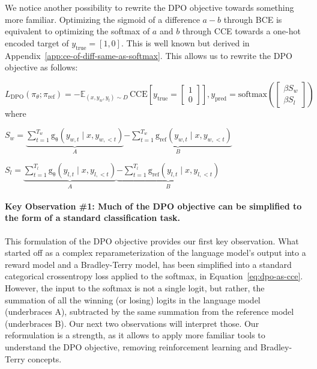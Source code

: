 \documentclass[twoside,11pt]{article}
\begin{document}
We notice another possibility to rewrite the DPO objective towards something
more familiar. Optimizing the sigmoid of a difference $a-b$ through BCE 
is equivalent to optimizing the softmax of $a$ and $b$ through CCE towards 
a one-hot encoded target of $y_\mathrm{true} = [1, 0]$. 
This is well known
but derived in Appendix~\ref{app:ce-of-diff-same-as-softmax}. This allows
us to rewrite the DPO objective as follows:

\begin{equation}
\label{eq:dpo-as-cce}
L_\mathrm{DPO}(\pi_\theta; \pi_\mathrm{ref}) = 
-\mathbb{E}_{(x, y_w, y_l) \sim D} \, 
\text{CCE}
\left[
y_\mathrm{true} = 
\begin{bmatrix}
1 \\ 
0
\end{bmatrix}
\right]
,
y_\mathrm{pred} = \text{softmax}
\left(
\begin{bmatrix}
\beta S_w \\ 
\beta S_l
\end{bmatrix}
\right)
\end{equation}
where
\begin{description}
\item
$ S_w = 
  \underbrace{
    \sum_{t=1}^{T_w} \mathrm{g_\theta}(y_{w,t} \mid x, y_{w,<t}) 
    }_{A}
    \underbrace{
  - 
  \sum_{t=1}^{T_w}\mathrm{g_\mathrm{ref}}(y_{w,t} \mid x, y_{w,<t})
  }_{B}
$
\item
$
S_l = 
  \underbrace{
    \sum_{t=1}^{T_l} \mathrm{g_\theta}(y_{l,t} \mid x, y_{l,<t}) 
  }_{A}
  \underbrace{
  - 
  \sum_{t=1}^{T_l} \mathrm{g_\mathrm{ref}}(y_{l,t} \mid x, y_{l,<t})
  }_{B}
$
\end{description}

\paragraph{Key Observation \#1: Much of the DPO objective 
can be simplified to the form of a 
standard classification task.} \label{obs:dpo-as-cce}
This formulation of the DPO objective provides our first key observation. 
What started off as a complex reparameterization 
of the language model's output into a reward
model and a Bradley-Terry model, 
has been simplified into a standard 
categorical crossentropy loss applied to the softmax, in
Equation~\ref{eq:dpo-as-cce}. However, the
input to the softmax is not a single logit, but rather, the 
summation of all the winning (or losing) logits in the language model
(underbraces A), 
subtracted by the same summation from the reference model (underbraces B).
Our next two observations will interpret those. Our reformulation
is a strength, as it allows to apply more familiar tools to understand
the DPO objective, removing reinforcement learning and Bradley-Terry concepts. 
\end{document}
